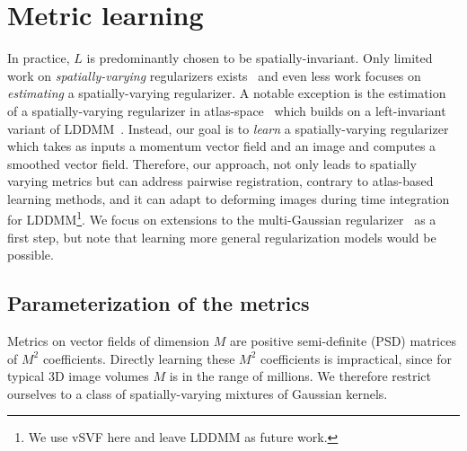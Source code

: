 \documentclass[10pt,twocolumn,letterpaper,table]{article}
\numberwithin{equation}{section}
\theoremstyle{plain}
\theoremstyle{definition}
\begin{document}
\section{Metric learning}
\label{sec:metric_learning}

In practice, $L$ is predominantly chosen to be spatially-invariant. Only limited work on \emph{spatially-varying} regularizers exists~\cite{risser2013piecewise,pace2013locally,stefanescu2004grid} and even less work focuses on \emph{estimating} a spatially-varying regularizer. A notable exception is the estimation of a spatially-varying regularizer in atlas-space~\cite{vialard2014spatially} which builds on a left-invariant variant of LDDMM~\cite{schmah2013left}. Instead, our goal is to \emph{learn} a spatially-varying regularizer which takes as inputs a momentum vector field and an image and computes a smoothed vector field. Therefore, our approach, not only leads to spatially varying metrics but can address pairwise registration, contrary to atlas-based learning methods, and it can adapt to deforming images during time integration for LDDMM\footnote{We use vSVF here and leave LDDMM as future work.}. We focus on extensions to the multi-Gaussian regularizer~\cite{risser2011simultaneous} as a first step, but note that learning more general regularization models would be possible.

\subsection{Parameterization of the metrics}
Metrics on vector fields of dimension $M$ are positive semi-definite (PSD) matrices of $M^2$ coefficients. Directly learning these $M^2$ coefficients is impractical, since for typical 3D image volumes $M$ is in the range of millions. We therefore restrict ourselves to a class of spatially-varying mixtures of Gaussian kernels.
\end{document}
